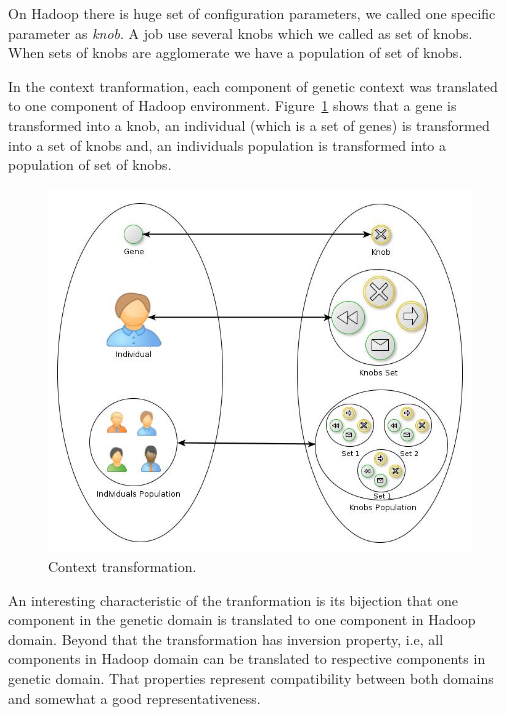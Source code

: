 On Hadoop there is huge set of configuration parameters, we called one specific 
parameter as \textit{knob}. A job use several knobs which we called as set of knobs. 
When sets of knobs are agglomerate we have a population of set of knobs.

In the context tranformation, each component of genetic
context was translated to one component of Hadoop environment. Figure~\ref{fig:transformation}
shows that a gene is transformed into a knob,
an individual (which is a set of genes) is transformed into a set of knobs and,
an individuals population is transformed into a population of set of knobs.

\begin{figure}[htbp]
        \centering
        \includegraphics[width=\columnwidth]{img/transformation.jpg}
        \caption{Context transformation.}\label{fig:transformation}
\end{figure}

An interesting characteristic of the tranformation is its bijection that one
component in the genetic domain is translated to one component in Hadoop domain. Beyond
that the transformation has inversion property, i.e, all components in Hadoop domain
can be translated to respective components in genetic domain. That properties
represent compatibility between both domains and somewhat a good representativeness.
\\
\\
\\
\\
\\
\\
\\
